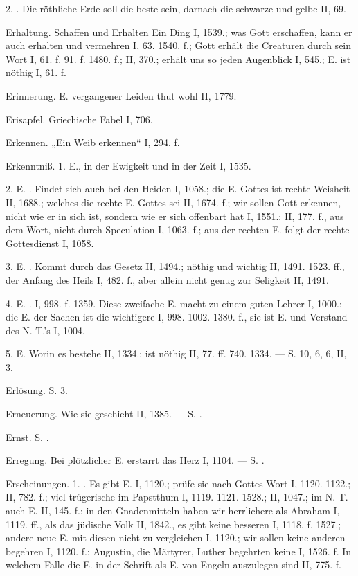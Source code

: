 2. . Die röthliche Erde soll die beste sein, darnach die schwarze und gelbe II, 69.

Erhaltung. Schaffen und Erhalten Ein Ding I, 1539.; was Gott erschaffen, kann er auch erhalten und vermehren I, 63. 1540. f.; Gott erhält die Creaturen durch sein Wort I, 61. f. 91. f. 1480. f.; II, 370.; erhält uns so jeden Augenblick I, 545.; E. ist nöthig I, 61. f.

Erinnerung. E. vergangener Leiden thut wohl II, 1779.

Erisapfel. Griechische Fabel I, 706.

Erkennen. „Ein Weib erkennen“ I, 294. f.

Erkenntniß. 1. E.,  in der Ewigkeit und in der Zeit I, 1535.

2. E. . Findet sich auch bei den Heiden I, 1058.; die E. Gottes ist rechte Weisheit II, 1688.; welches die rechte E. Gottes sei II, 1674. f.; wir sollen Gott erkennen, nicht wie er in sich ist, sondern wie er sich offenbart hat I, 1551.; II, 177. f., aus dem Wort, nicht durch Speculation I, 1063. f.; aus der rechten E. folgt der rechte Gottesdienst I, 1058.

3. E. . Kommt durch das Gesetz II, 1494.; nöthig und wichtig II, 1491. 1523. ff., der Anfang des Heils I, 482. f., aber allein nicht genug zur Seligkeit II, 1491.

4. E. . I, 998. f. 1359. Diese zweifache E. macht zu einem guten Lehrer I, 1000.; die E. der Sachen ist die wichtigere I, 998. 1002. 1380. f., sie ist E. und Verstand des N. T.’s I, 1004.

5.  E. Worin es bestehe II, 1334.; ist nöthig II, 77. ff. 740. 1334. — S.  10,  6,  6,  II, 3.

Erlösung. S.  3.

Erneuerung. Wie sie geschieht II, 1385. — S. .

Ernst. S. .

Erregung. Bei plötzlicher E. erstarrt das Herz I, 1104. — S. .

Erscheinungen. 1. . Es gibt E. I, 1120.; prüfe sie nach Gottes Wort I, 1120. 1122.; II, 782. f.; viel trügerische im Papstthum I, 1119. 1121. 1528.; II, 1047.; im N. T. auch E. II, 145. f.; in den Gnadenmitteln haben wir herrlichere als Abraham I, 1119. ff., als das jüdische Volk II, 1842., es gibt keine besseren I, 1118. f. 1527.; andere neue E. mit diesen nicht zu vergleichen I, 1120.; wir sollen keine anderen begehren I, 1120. f.; Augustin, die Märtyrer, Luther begehrten keine I, 1526. f. In welchem Falle die E. in der Schrift als E. von Engeln auszulegen sind II, 775. f.

